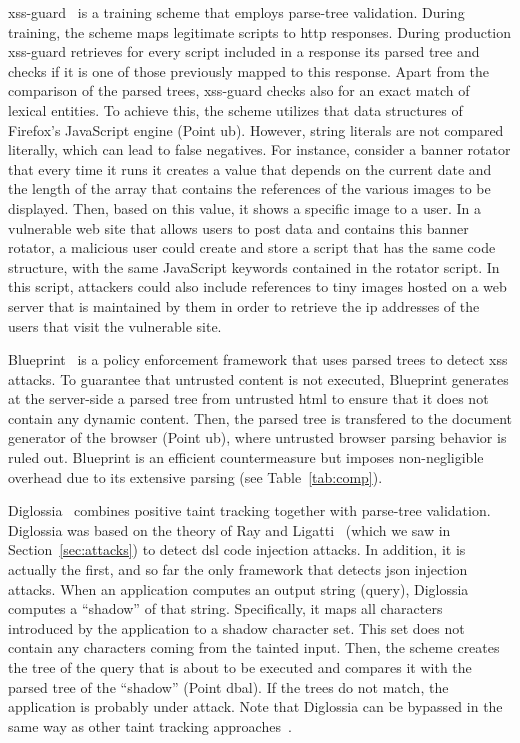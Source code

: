 \documentclass[10pt,journal,compsoc]{IEEEtran}
\begin{document}
{\sc xss-guard}~\cite{BV08} is a training scheme that employs
parse-tree validation. During training, the scheme maps legitimate
scripts to {\sc http} responses. During production {\sc xss-guard}
retrieves for every script included in a response its parsed tree and
checks if it is one of those previously mapped to this response. Apart
from the comparison of the parsed trees, {\sc xss-guard} checks also
for an exact match of lexical entities. To achieve this, the scheme
utilizes that data structures of Firefox's JavaScript engine (Point
{\sc ub}). However, string literals are not compared literally, which
can lead to false negatives. For instance, consider a banner rotator
that every time it runs it creates a value that depends on the
current date and the length of the array that contains the references
of the various images to be displayed. Then, based on this value, it
shows a specific image to a user. In a vulnerable web site that allows
users to post data and contains this banner rotator, a malicious user
could create and store a script that has the same code structure, with
the same JavaScript keywords contained in the rotator script.
In this script, attackers could also include references to tiny
images hosted on a web server that is maintained by them in order to
retrieve the {\sc ip} addresses of the users that visit the vulnerable
site.

Blueprint~\cite{LV09} is a policy enforcement framework that
uses parsed trees to detect {\sc xss} attacks. To guarantee
that untrusted content is not executed, Blueprint generates at the
server-side a parsed tree from untrusted {\sc html} to ensure that it
does not contain any dynamic content. Then, the parsed tree is
transfered to the document generator of the browser (Point {\sc ub}),
where untrusted browser parsing behavior is ruled out.
Blueprint is an efficient countermeasure but imposes non-negligible
overhead due to its extensive parsing (see Table~\ref{tab:comp}).

Diglossia~\cite{SMS13} combines positive taint tracking together
with parse-tree validation. Diglossia was based on the theory of Ray
and Ligatti~\cite{RL12b} (which we saw in Section~\ref{sec:attacks})
to detect {\sc dsl} code injection attacks. In addition, it is
actually the first, and so far the only framework that detects {\sc
  json} injection attacks. When an application computes an output
string (query), Diglossia computes a ``shadow'' of that string.
Specifically, it maps all characters introduced by the application to
a shadow character set. This set does not contain any characters
coming from the tainted input. Then, the scheme creates the tree of
the query that is about to be executed and compares it with the parsed
tree of the ``shadow'' (Point {\sc dbal}). If the trees do not match,
the application is probably under attack. Note that Diglossia
can be bypassed in the same way as other taint tracking
approaches~\cite{NBR14}.
\end{document}
